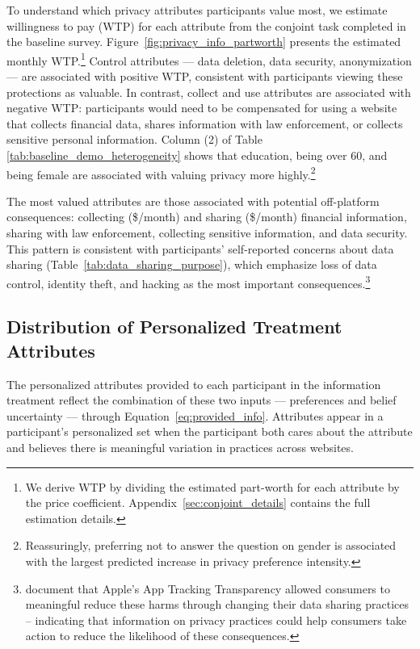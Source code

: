 \documentclass[12pt]{article}
\theoremstyle{definition}
\theoremstyle{remark}
\begin{document}
To understand which privacy attributes participants value most, we estimate willingness to pay (WTP) for each attribute from the conjoint task completed in the baseline survey. Figure~\ref{fig:privacy_info_partworth} presents the estimated monthly WTP.\footnote{We derive WTP by dividing the estimated part-worth for each attribute by the price coefficient. Appendix~\ref{sec:conjoint_details} contains the full estimation details.} Control attributes --- data deletion, data security, anonymization --- are associated with positive WTP, consistent with participants viewing these protections as valuable. In contrast, collect and use attributes are associated with negative WTP: participants would need to be compensated for using a website that collects financial data, shares information with law enforcement, or collects sensitive personal information. Column (2) of Table \ref{tab:baseline_demo_heterogeneity} shows that education, being over 60, and being female are associated with valuing privacy more highly.\footnote{Reassuringly, preferring not to answer the question on gender is associated with the largest predicted increase in privacy preference intensity.}

The most valued attributes are those associated with potential off-platform consequences: collecting (\$\wtpCollectFinancial{}/month) and sharing (\$\wtpShareFinancial{}/month) financial information, sharing with law enforcement, collecting sensitive information, and data security. This pattern is consistent with participants' self-reported concerns about data sharing (Table~\ref{tab:data_sharing_purpose}), which emphasize loss of data control, identity theft, and hacking as the most important consequences.\footnote{\cite{bian2023consumer} document that Apple's App Tracking Transparency allowed consumers to meaningful reduce these harms through changing their data sharing practices -- indicating that information on privacy practices could help consumers take action to reduce the likelihood of these consequences.}

\subsection{Distribution of Personalized Treatment Attributes}

The personalized attributes provided to each participant in the information treatment reflect the combination of these two inputs --- preferences and belief uncertainty --- through Equation~\eqref{eq:provided_info}. Attributes appear in a participant's personalized set when the participant both cares about the attribute and believes there is meaningful variation in practices across websites.
\end{document}
